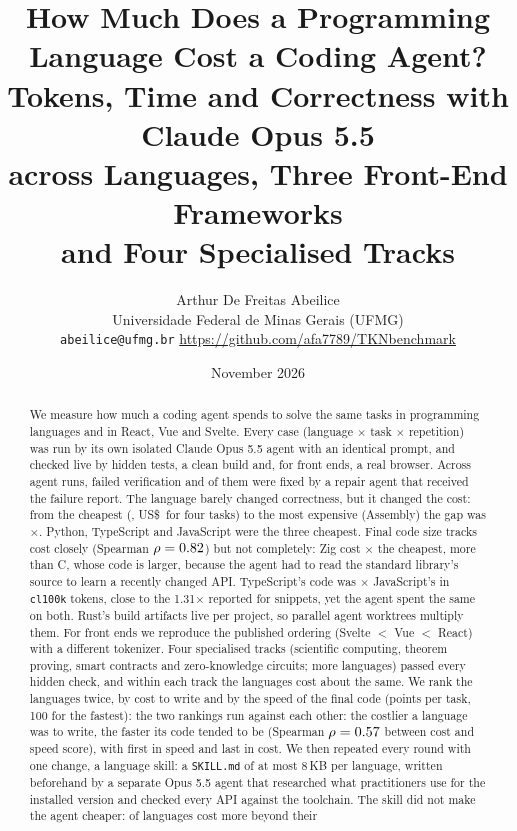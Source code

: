\documentclass[11pt,a4paper]{article}
\title{\textbf{How Much Does a Programming Language Cost a Coding Agent?}\\[4pt]
\large Tokens, Time and Correctness with Claude Opus 5.5\\across \NLangs{} Languages, Three Front-End Frameworks\\and Four Specialised Tracks}
\author{Arthur De Freitas Abeilice\\
\small Universidade Federal de Minas Gerais (UFMG)\\
\small\texttt{abeilice@ufmg.br} \quad \url{https://github.com/afa7789/TKNbenchmark}}
\date{November 2026}
\begin{document}
\maketitle

\begin{abstract}
\noindent
We measure how much a coding agent spends to solve the same tasks in \NLangs{} programming languages
and in React, Vue and Svelte. Every case (language $\times$ task $\times$ repetition) was run by its own
isolated Claude Opus 5.5 agent with an identical prompt, and checked live by hidden tests, a clean build
and, for front ends, a real browser. Across \NRuns{} agent runs, \NFailedRoundThree{} failed verification and
\NFixed{} of them were fixed by a repair agent that received the failure report. The language barely
changed correctness, but it changed the cost: from the cheapest (\CheapestLang, US\$\,\CostCheapest{} for
four tasks) to the most expensive (Assembly) the gap was \RatioAsm$\times$. Python, TypeScript and
JavaScript were the three cheapest. Final code size tracks cost closely (Spearman $\rho =
0.82$) but not completely: Zig cost \RatioZig$\times$ the cheapest, more than C, whose
code is larger, because the agent had to read the standard library's source to learn a recently changed
API. TypeScript's code was \TsJsCodeClk$\times$ JavaScript's in \texttt{cl100k} tokens, close to the
1.31$\times$ reported for snippets, yet the agent spent the same on both. Rust's build artifacts live per
project, so parallel agent worktrees multiply them. For front ends we reproduce the published ordering
(Svelte $<$ Vue $<$ React) with a different tokenizer. Four specialised tracks (scientific computing,
theorem proving, smart contracts and zero-knowledge circuits; \NTrackLangs{} more languages) passed every
hidden check, and within each track the languages cost about the same. We rank the languages twice, by
cost to write and by the speed of the final code (points per task, 100 for the fastest): the two
rankings run against each other: the costlier a language was to write, the faster its code tended to be
(Spearman $\rho = 0.57$ between cost and speed score), with \FastestLang{} first in speed and
last in cost. We then repeated every round with one change, a language skill: a \texttt{SKILL.md} of at
most 8\,KB per language, written beforehand by a separate Opus 5.5 agent that researched what
practitioners use for the installed version and checked every API against the toolchain. The skill did not
make the agent cheaper: \NSkillCostlier{} of \NSkillLangs{} languages cost more beyond their

\end{abstract}
\end{document}
